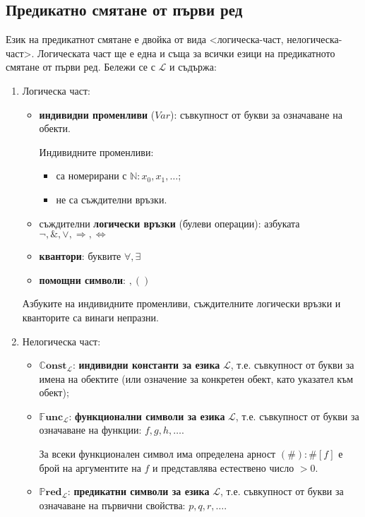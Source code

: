 \documentclass{article}
\begin{document}
\subsection*{Предикатно смятане от първи ред}

\begin{mydef}
Език на предикатнот смятане е двойка от вида <логическа-част, нелогическа-част>. Логическата част ще е една и съща за всички езици на предикатното смятане от първи ред. Бележи се с $\mathcal{L}$ и съдържа:

\begin{enumerate}
\item Логическа част:
\begin{itemize}
\item \textbf{индивидни променливи} ($Var$): съвкупност от букви за означаване на обекти. 

Индивидните променливи:
\begin{itemize}
\item са номерирани с $\mathbb{N}: x_0, x_1, \ldots$;
\item не са съждителни връзки.
\end{itemize} 

\item съждителни \textbf{логически връзки} (булеви операции): азбуката $\neg, \&, \lor, \Rightarrow, \Leftrightarrow$
\item \textbf{квантори}: буквите $\forall, \exists$
\item \textbf{помощни символи}: $, ( )$
\end{itemize}

\begin{remark}
Азбуките на индивидните променливи, съждителните логически връзки и кванторите са винаги непразни.
\end{remark}

\item Нелогическа част:
\begin{itemize}
\item $\bm{\mathbb{C}onst_\mathcal{L}}$: \textbf{индивидни константи за езика} $\mathcal{L}$, т.е. съвкупност от букви за имена на обектите (или означение за конкретен обект, като указател към обект);
\item $\bm{\mathbb{F}unc_\mathcal{L}}$: \textbf{функционални символи за езика} $\mathcal{L}$, т.е. съвкупност от букви за означаване на функции: $f, g, h, \ldots$.

За всеки функционален символ има определена арност $(\#): \#[f]$ е брой на аргументите на $f$ и представлява естествено число $> 0$.
\item $\bm{\mathbb{P}red_\mathcal{L}}$: \textbf{предикатни символи за езика} $\mathcal{L}$, т.е. съвкупност от букви за означаване на първични свойства: $p, q, r, \ldots$.


\end{itemize}
\end{enumerate}
\end{mydef}
\end{document}
